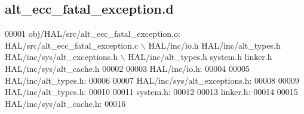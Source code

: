 \subsection{alt\+\_\+ecc\+\_\+fatal\+\_\+exception.\+d}
\label{alt__ecc__fatal__exception_8d_source}

\begin{DoxyCode}
00001 obj/HAL/src/alt\_ecc\_fatal\_exception.o: HAL/src/alt\_ecc\_fatal\_exception.c \(\backslash\)
 HAL/inc/io.h HAL/inc/alt\_types.h HAL/inc/sys/alt\_exceptions.h \(\backslash\)
 HAL/inc/alt\_types.h system.h linker.h HAL/inc/sys/alt\_cache.h
00002 
00003 HAL/inc/io.h:
00004 
00005 HAL/inc/alt\_types.h:
00006 
00007 HAL/inc/sys/alt\_exceptions.h:
00008 
00009 HAL/inc/alt\_types.h:
00010 
00011 system.h:
00012 
00013 linker.h:
00014 
00015 HAL/inc/sys/alt\_cache.h:
00016 \end{DoxyCode}

